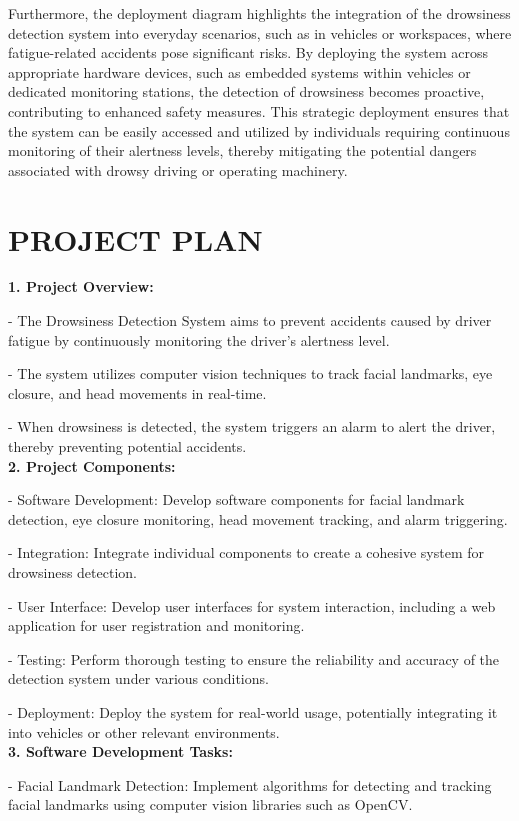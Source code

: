 \documentclass[12pt]{article}
\begin{document}
Furthermore, the deployment diagram highlights the integration of the drowsiness detection system into everyday scenarios, such as in vehicles or workspaces, where fatigue-related accidents pose significant risks. By deploying the system across appropriate hardware devices, such as embedded systems within vehicles or dedicated monitoring stations, the detection of drowsiness becomes proactive, contributing to enhanced safety measures. This strategic deployment ensures that the system can be easily accessed and utilized by individuals requiring continuous monitoring of their alertness levels, thereby mitigating the potential dangers associated with drowsy driving or operating machinery. 

\newpage
\section{PROJECT PLAN }
\textbf{1. Project Overview:}

   - The Drowsiness Detection System aims to prevent accidents caused by driver fatigue by continuously monitoring the driver's alertness level.

   - The system utilizes computer vision techniques to track facial landmarks, eye closure, and head movements in real-time.

   - When drowsiness is detected, the system triggers an alarm to alert the driver, thereby preventing potential accidents.\\
\textbf{2. Project Components:}

   - Software Development: Develop software components for facial landmark detection, eye closure monitoring, head movement tracking, and alarm triggering.
   
   - Integration: Integrate individual components to create a cohesive system for drowsiness detection.

   - User Interface: Develop user interfaces for system interaction, including a web application for user registration and monitoring.

   - Testing: Perform thorough testing to ensure the reliability and accuracy of the detection system under various conditions.

   - Deployment: Deploy the system for real-world usage, potentially integrating it into vehicles or other relevant environments.\\
\textbf{3. Software Development Tasks:}

   - Facial Landmark Detection: Implement algorithms for detecting and tracking facial landmarks using computer vision libraries such as OpenCV.
\end{document}
